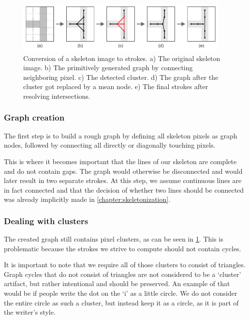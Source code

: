 \begin{figure}
  \centering
  \includegraphics[width=0.95\textwidth]{../assets/sampling/cluster_removal/cluster_removal.pdf}
  \caption[Conversion of a skeleton image to strokes]{Conversion of a skeleton image to strokes. a) The original skeleton image. b) The primitively generated graph by connecting neighboring pixel. c) The detected cluster. d) The graph after the cluster got replaced by a mean node. e) The final strokes after resolving intersections.}
  \label{fig:skeletonToStrokeSmall}
\end{figure}

\subsubsection{Graph creation}
The first step is to build a rough graph by defining all skeleton pixels as graph nodes, followed by connecting all directly or diagonally touching pixels.

This is where it becomes important that the lines of our skeleton are complete and do not contain gaps. The graph would otherwise be disconnected and would later result in two separate strokes. At this step, we assume continuous lines are in fact connected and that the decision of whether two lines should be connected was already implicitly made in \cref{chapter:skeletonization}.

\subsubsection{Dealing with clusters}
The created graph still contains pixel clusters, as can be seen in \cref{fig:skeletonToStrokeSmall}. This is problematic because the strokes we strive to compute should not contain cycles.

It is important to note that we require all of those clusters to consist of triangles. Graph cycles that do not consist of triangles are not considered to be a `cluster' artifact, but rather intentional and should be preserved. An example of that would be if people write the dot on the `i' as a little circle. We do not consider the entire circle as such a cluster, but instead keep it as a circle, as it is part of the writer's style.


